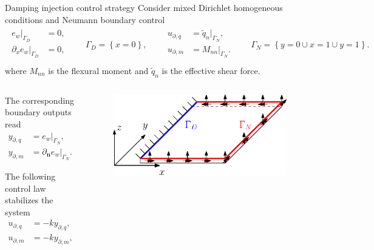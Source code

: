 \documentclass[aspectratio=169]{ISAE-Beamer}
\begin{document}
\begin{frame}{Damping injection control strategy}
Consider mixed Dirichlet homogeneous conditions and Neumann boundary control
\begin{align*}
	\begin{aligned}
		e_w|_{\Gamma_D} &= 0, \\
		\partial_x e_w|_{\Gamma_D} &= 0, \\
	\end{aligned} \qquad {\Gamma_D} = \left\{x = 0 \right\}, \qquad
	\begin{aligned}
		u_{\partial, q} & = \widetilde{q}_n|_{\Gamma_N},\\
		u_{\partial, m} &= M_{nn}|_{\Gamma_N}.\\
	\end{aligned} \qquad {\Gamma_N} = \left\{y = 0 \cup x=1 \cup y=1 \right\}.
\end{align*}
where $M_{nn}$ is the flexural moment and $\widetilde{q}_n$ is the effective shear force. \vspace{.5cm}
\begin{columns}
	\setlength{\abovedisplayskip}{5pt}
	\setlength{\belowdisplayskip}{5pt}
	\begin{column}{.5\textwidth}
		The corresponding boundary outputs read
		\begin{equation*}
			\begin{aligned}
				y_{\partial, q} &= e_w|_{\Gamma_N}, \\
				y_{\partial, m} &=\partial_{\bm{n}} e_w|_{\Gamma_N}.
			\end{aligned}
		\end{equation*}
		
		The following control law stabilizes the system\footnotemark
		\begin{equation*}
			\begin{aligned}
				u_{\partial, q} & = - k y_{\partial, q}, \\
				u_{\partial, m} & = - k y_{\partial, m}, \\
			\end{aligned} \qquad k>0.
		\end{equation*}
		
	\end{column}
	
	\begin{column}{.5\textwidth}
		\begin{figure}[b]
			\centering
			\includegraphics[width=0.9\columnwidth]{bs_Kirchh/plate_controlled.eps}
		\end{figure}
	\end{column}
\end{columns}


\end{frame}
\end{document}
